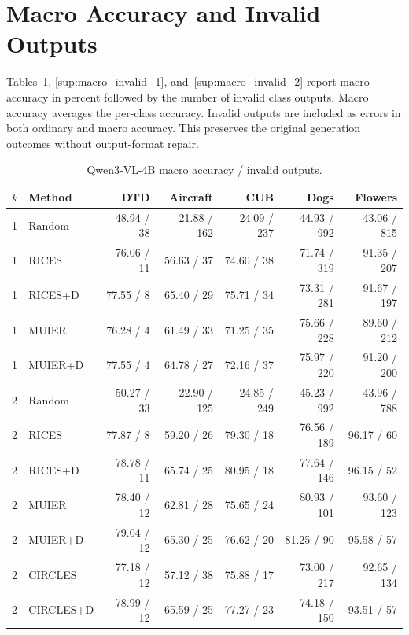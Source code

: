 \documentclass[10pt,twocolumn,letterpaper]{article}
\begin{document}
\section{Macro Accuracy and Invalid Outputs}
Tables~\ref{sup:macro_invalid_0}, \ref{sup:macro_invalid_1}, and~\ref{sup:macro_invalid_2} report macro accuracy in percent followed by the number of invalid class outputs. Macro accuracy averages the per-class accuracy. Invalid outputs are included as errors in both ordinary and macro accuracy. This preserves the original generation outcomes without output-format repair.

\begin{table}[t]
\caption{Qwen3-VL-4B macro accuracy / invalid outputs.}
\label{sup:macro_invalid_0}
\centering\small
\begin{tabular}{llrrrrr}
\toprule
$k$ & Method & DTD & Aircraft & CUB & Dogs & Flowers \\
\midrule
1 & Random & 48.94 / 38 & 21.88 / 162 & 24.09 / 237 & 44.93 / 992 & 43.06 / 815 \\
1 & RICES & 76.06 / 11 & 56.63 / 37 & 74.60 / 38 & 71.74 / 319 & 91.35 / 207 \\
1 & RICES+D & 77.55 / 8 & 65.40 / 29 & 75.71 / 34 & 73.31 / 281 & 91.67 / 197 \\
1 & MUIER & 76.28 / 4 & 61.49 / 33 & 71.25 / 35 & 75.66 / 228 & 89.60 / 212 \\
1 & MUIER+D & 77.55 / 4 & 64.78 / 27 & 72.16 / 37 & 75.97 / 220 & 91.20 / 200 \\
2 & Random & 50.27 / 33 & 22.90 / 125 & 24.85 / 249 & 45.23 / 992 & 43.96 / 788 \\
2 & RICES & 77.87 / 8 & 59.20 / 26 & 79.30 / 18 & 76.56 / 189 & 96.17 / 60 \\
2 & RICES+D & 78.78 / 11 & 65.74 / 25 & 80.95 / 18 & 77.64 / 146 & 96.15 / 52 \\
2 & MUIER & 78.40 / 12 & 62.81 / 28 & 75.65 / 24 & 80.93 / 101 & 93.60 / 123 \\
2 & MUIER+D & 79.04 / 12 & 65.30 / 25 & 76.62 / 20 & 81.25 / 90 & 95.58 / 57 \\
2 & CIRCLES & 77.18 / 12 & 57.12 / 38 & 75.88 / 17 & 73.00 / 217 & 92.65 / 134 \\
2 & CIRCLES+D & 78.99 / 12 & 65.59 / 25 & 77.27 / 23 & 74.18 / 150 & 93.51 / 57 \\
\bottomrule
\end{tabular}
\end{table}
\end{document}
